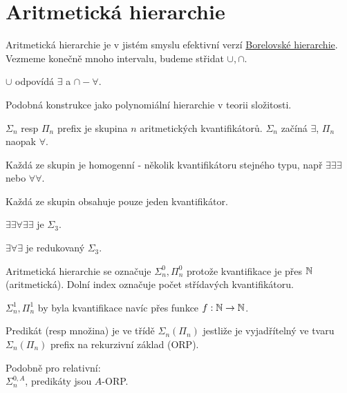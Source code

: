\section{\texorpdfstring{Aritmetická hierarchie}{Aritmetická hierarchie}}
\vspace{5mm}
\large


\begin{note}
	Aritmetická hierarchie je v jistém smyslu efektivní verzí \href{https://en.wikipedia.org/wiki/Borel_hierarchy}{Borelovské hierarchie}. Vezmeme konečně mnoho intervalu, budeme střidat $\cup, \cap$.

	$\cup$ odpovídá $\exists$ a $\cap - \forall$.
\end{note}

\begin{note}
	Podobná konstrukce jako polynomiální hierarchie v teorii složitosti.
\end{note}

\begin{definition}[$\Sigma_n, \Pi_n$]
	$\Sigma_n$ resp $\Pi_n$ prefix je skupina $n$ aritmetických kvantifikátorů. $\Sigma_n$ začíná $\exists$, $\Pi_n$ naopak $\forall$.

	Každá ze skupin je homogenní - několik kvantifikátoru stejného typu, např $\exists\exists\exists$ nebo $\forall\forall$.
\end{definition}

\begin{definition}
	Každá ze skupin obsahuje pouze jeden kvantifikátor.
\end{definition}

\begin{example}
	$\exists\exists\forall\exists\exists$ je $\Sigma_3$.

	$\exists\forall\exists$ je redukovaný $\Sigma_3$.
\end{example}

\begin{note}
	Aritmetická hierarchie se označuje $\Sigma_n^0, \Pi_n^0$ protože kvantifikace je přes $\operatorname{\mathbb{N}}$ (aritmetická).
	Dolní index označuje počet střídavých kvantifikátoru.

	$\Sigma_n^1, \Pi_n^1$ by byla kvantifikace navíc přes funkce $f:\operatorname{\mathbb{N}} \to \operatorname{\mathbb{N}}$.
\end{note}

\begin{definition}
	Predikát (resp množina) je ve třídě $\Sigma_n (\Pi_n)$ jestliže je vyjadřítelný ve tvaru $\Sigma_n (\Pi_n)$ prefix na rekurzivní základ (ORP).

	Podobně pro relativní: \\
	$ \Sigma_n^{0, A}$, predikáty jsou $A$-ORP.
\end{definition}

